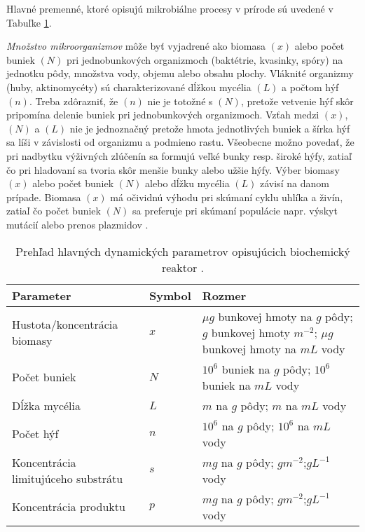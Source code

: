 Hlavné premenné, ktoré opisujú mikrobiálne procesy v prírode sú uvedené v Tabuľke \ref{tab: 1}.

\textit{Množstvo mikroorganizmov} môže byť vyjadrené ako biomasa $(x)$ alebo počet buniek $(N)$ pri jednobunkových organizmoch (baktétrie, kvasinky, spóry) na jednotku pôdy, množstva vody, objemu alebo obsahu plochy. Vláknité organizmy (huby, aktinomycéty) sú charakterizované dĺžkou mycélia $(L)$ a počtom hýf $(n)$. Treba zdôrazniť, že $(n)$ nie je totožné s $(N)$, pretože vetvenie hýf skôr pripomína delenie buniek pri jednobunkových organizmoch. Vzťah medzi $(x)$, $(N)$ a $(L)$ nie je jednoznačný pretože hmota jednotlivých buniek a šírka hýf sa líši v závislosti od organizmu a podmieno rastu. Všeobecne možno povedať, že pri nadbytku výživných zlúčenín sa formujú veľké bunky resp. široké hýfy, zatiaľ čo pri hladovaní sa tvoria skôr menšie bunky alebo užšie hýfy. Výber biomasy $(x)$ alebo počet buniek $(N)$ alebo dĺžku mycélia $(L)$ závisí na danom prípade. Biomasa $(x)$ má očividnú výhodu pri skúmaní cyklu uhlíka a živín, zatiaľ čo počet buniek $(N)$ sa preferuje pri skúmaní populácie napr. výskyt mutácií alebo prenos plazmidov \cite{ref2}.

\begin{table}[H]
	\caption{Prehľad hlavných dynamických parametrov opisujúcich biochemický reaktor \cite{ref2}.}
	\label{tab: 1}
	\begin{tabular}{p{5cm} p{1.9cm} p{4cm}}
		\hline
		\textbf{Parameter} & \textbf{Symbol} & \textbf{Rozmer} \\ 
		\hline
		Hustota/koncentrácia biomasy & $x$ & $\mu g$ bunkovej hmoty na $g$ pôdy; $g$ bunkovej hmoty $m^{-2}$; $\mu g$ bunkovej hmoty na $mL$ vody\\
		Počet buniek & $N$ & $10^{6}$ buniek na $g$ pôdy; $10^{6}$ buniek na $mL$ vody\\
		Dĺžka mycélia & $L$ & $m$ na $g$ pôdy; $m$ na $mL$ vody\\
		Počet hýf & $n$ & $10^{6}$ na $g$ pôdy; $10^{6}$ na $mL$ vody\\
		Koncentrácia limitujúceho substrátu & $s$ & $mg$ na $g$ pôdy; $gm^{-2}$;$gL^{-1}$ vody\\
		Koncentrácia produktu & $p$ & $mg$ na $g$ pôdy; $gm^{-2}$;$gL^{-1}$ vody\\
		\hline	
	\end{tabular}
\end{table}

